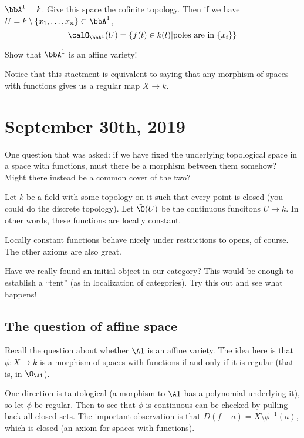 \documentclass[12pt]{article}
\begin{document}
\begin{ex}
	$\bbA^1=k$. Give this space the cofinite topology. Then if we have $U=k\setminus\{x_1,\dots,x_n\}\subset \bbA^1$,
	\[\calO_{\bbA^1}(U)=\{f(t)\in k(t)| \text{poles are in }\{x_i\}\}\]
\end{ex}
\begin{prob}
	Show that $\bbA^1$ is an affine variety!
\end{prob}
\begin{rmk}
	Notice that this staetment is equivalent to saying that any morphism of spaces with functions gives us a regular map $X\to k$.
\end{rmk}

\section{September 30th, 2019}
One question that was asked: if we have fixed the underlying topological space in a space with functions, must there be a morphism 
between them somehow? Might there instead be a common cover of the two?

\begin{ex}
	Let $k$ be a field with some topology on it such that every point is closed (you could do the discrete topology).
	Let $\tilde\O(U)$ be the continuous funcitons $U\to k$. In other words, these functions are locally constant.

	Locally constant functions behave nicely under restrictions to opens, of course. The other axioms are also great.

	Have we really found an initial object in our category? This would be enough to establish a ``tent'' (as in 
	localization of categories). Try this out and see what happens!
\end{ex}

\subsection{The question of affine space}
Recall the question about whether $\A 1$ is an affine variety. The idea here is that $\phi:X\to k$ is a morphism of 
spaces with functions if and only if it is regular (that is, in $\O_{\A 1}$).

One direction is tautological (a morphism to $\A1$ has a polynomial underlying it), so let $\phi$ be regular. Then to see that $\phi$ is continuous 
can be checked by pulling back all closed sets. The important observation is that $D(f-a)=X\setminus\phi^{-1}(a)$, which is closed (an axiom for spaces with functions).
\end{document}
